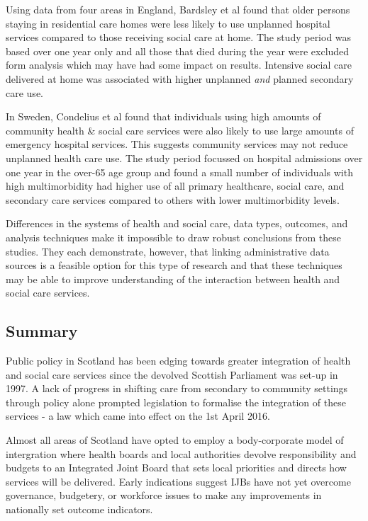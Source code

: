 \documentclass[12pt,]{report}
\begin{document}
Using data from four areas in England, Bardsley et al
\citeyearpar{RN183} found that older persons staying in residential care
homes were less likely to use unplanned hospital services compared to
those receiving social care at home. The study period was based over one
year only and all those that died during the year were excluded form
analysis which may have had some impact on results. Intensive social
care delivered at home was associated with higher unplanned \textit{and}
planned secondary care use.

In Sweden, Condelius et al \citeyearpar{RN30} found that individuals
using high amounts of community health \& social care services were also
likely to use large amounts of emergency hospital services. This
suggests community services may not reduce unplanned health care use.
The study period focussed on hospital admissions over one year in the
over-65 age group and found a small number of individuals with high
multimorbidity had higher use of all primary healthcare, social care,
and secondary care services compared to others with lower multimorbidity
levels.

Differences in the systems of health and social care, data types,
outcomes, and analysis techniques make it impossible to draw robust
conclusions from these studies. They each demonstrate, however, that
linking administrative data sources is a feasible option for this type
of research and that these techniques may be able to improve
understanding of the interaction between health and social care
services.

\subsection{Summary}\label{subsec:hsc-interaction-summary}

Public policy in Scotland has been edging towards greater integration of
health and social care services since the devolved Scottish Parliament
was set-up in 1997. A lack of progress in shifting care from secondary
to community settings through policy alone prompted legislation to
formalise the integration of these services - a law which came into
effect on the 1st April 2016.

Almost all areas of Scotland have opted to employ a body-corporate model
of intergration where health boards and local authorities devolve
responsibility and budgets to an Integrated Joint Board that sets local
priorities and directs how services will be delivered. Early indications
suggest IJBs have not yet overcome governance, budgetery, or workforce
issues to make any improvements in nationally set outcome indicators.
\end{document}
